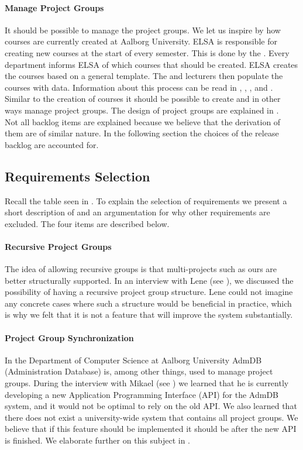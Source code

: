 \paragraph{Manage Project Groups}
It should be possible to manage the project groups. 
We let us inspire by how courses are currently created at Aalborg University.
ELSA is responsible for creating new courses at the start of every semester. 
This is done by the \admpers{}.
Every department informs ELSA of which courses that should be created. 
ELSA creates the courses based on a general template.
The \admpers{} and lecturers then populate the courses with data. 
Information about this process can be read in , , , and .
Similar to the creation of courses it should be possible to create and in other ways manage project groups. 
The design of project groups are explained in . \\

Not all backlog items are explained because we believe that the derivation of them are of similar nature.
In the following section the choices of the release backlog are accounted for.

\subsection{Requirements Selection}
\label{sec:releaseBacklog}
Recall the table seen in . 
To explain the selection of requirements we present a short description of and an argumentation for why other requirements are excluded.
The four items are described below.

\paragraph{Recursive Project Groups}
The idea of allowing recursive groups is that multi-projects such as ours are better structurally supported.
In an interview with Lene (see ), we discussed the possibility of having a recursive project group structure.
Lene could not imagine any concrete cases where such a structure would be beneficial in practice, which is why we felt that it is not a feature that will improve the system substantially. 

\paragraph{Project Group Synchronization}
In the Department of Computer Science at Aalborg University AdmDB (Administration Database) is, among other things, used to manage project groups. 
During the interview with Mikael (see ) we learned that he is currently developing a new Application Programming Interface (API) for the AdmDB system, and it would not be optimal to rely on the old API.
We also learned that there does not exist a university-wide system that contains all project groups. 
We believe that if this feature should be implemented it should be after the new API is finished.
We elaborate further on this subject in . 

